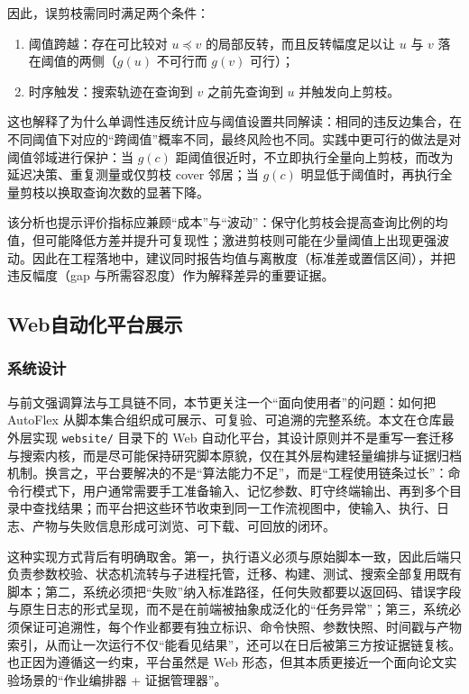 \documentclass[UTF8,a4paper,12pt,twoside]{ctexart}  %
\begin{document}
因此，误剪枝需同时满足两个条件：
\begin{enumerate}
  \def\labelenumi{\arabic{enumi}.}
  \item
        阈值跨越：存在可比较对 \(u\preceq v\)
        的局部反转，而且反转幅度足以让 \(u\) 与 \(v\) 落在阈值的两侧（\(g(u)\)
        不可行而 \(g(v)\) 可行）；
  \item
        时序触发：搜索轨迹在查询到 \(v\) 之前先查询到 \(u\)
        并触发向上剪枝。
\end{enumerate}

这也解释了为什么单调性违反统计应与阈值设置共同解读：相同的违反边集合，在不同阈值下对应的``跨阈值''概率不同，最终风险也不同。实践中更可行的做法是对阈值邻域进行保护：当
\(g(c)\)
距阈值很近时，不立即执行全量向上剪枝，而改为延迟决策、重复测量或仅剪枝
cover 邻居；当 \(g(c)\)
明显低于阈值时，再执行全量剪枝以换取查询次数的显著下降。

该分析也提示评价指标应兼顾``成本''与``波动''：保守化剪枝会提高查询比例的均值，但可能降低方差并提升可复现性；激进剪枝则可能在少量阈值上出现更强波动。因此在工程落地中，建议同时报告均值与离散度（标准差或置信区间），并把违反幅度（gap
与所需容忍度）作为解释差异的重要证据。

\subsection{Web自动化平台展示}

\subsubsection{系统设计}
与前文强调算法与工具链不同，本节更关注一个``面向使用者''的问题：如何把 AutoFlex
从脚本集合组织成可展示、可复验、可追溯的完整系统。本文在仓库最外层实现
\texttt{website/}
目录下的 Web 自动化平台，其设计原则并不是重写一套迁移与搜索内核，而是尽可能保持研究脚本原貌，仅在其外层构建轻量编排与证据归档机制。换言之，平台要解决的不是``算法能力不足''，而是``工程使用链条过长''：命令行模式下，用户通常需要手工准备输入、记忆参数、盯守终端输出、再到多个目录中查找结果；而平台把这些环节收束到同一工作流视图中，使输入、执行、日志、产物与失败信息形成可浏览、可下载、可回放的闭环。

这种实现方式背后有明确取舍。第一，执行语义必须与原始脚本一致，因此后端只负责参数校验、状态机流转与子进程托管，迁移、构建、测试、搜索全部复用既有脚本；第二，系统必须把``失败''纳入标准路径，任何失败都要以返回码、错误字段与原生日志的形式呈现，而不是在前端被抽象成泛化的``任务异常''；第三，系统必须保证可追溯性，每个作业都要有独立标识、命令快照、参数快照、时间戳与产物索引，从而让一次运行不仅``能看见结果''，还可以在日后被第三方按证据链复核。也正因为遵循这一约束，平台虽然是 Web 形态，但其本质更接近一个面向论文实验场景的``作业编排器 + 证据管理器''。
\end{document}
